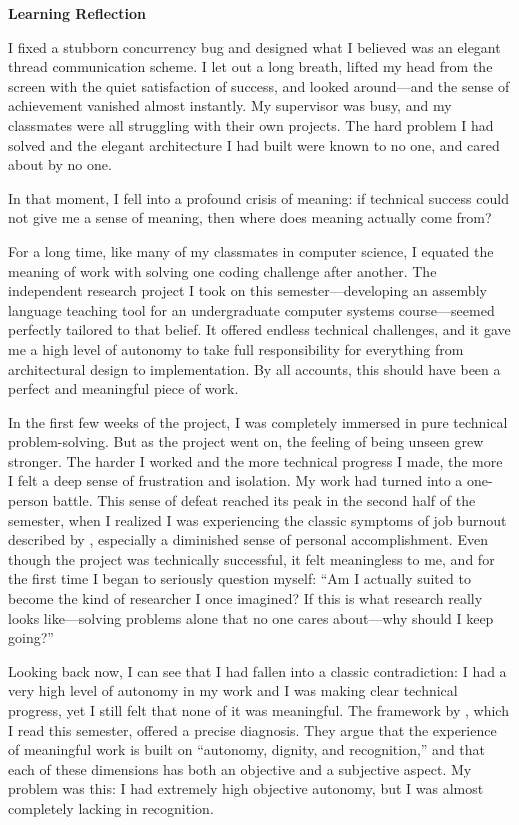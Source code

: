 \documentclass[12pt,a4paper]{article}
\begin{document}
\begin{center}
\textbf{\LARGE Learning Reflection}
\end{center}

\vspace{0.5cm}

I fixed a stubborn concurrency bug and designed what I believed was an elegant thread communication scheme. I let out a long breath, lifted my head from the screen with the quiet satisfaction of success, and looked around---and the sense of achievement vanished almost instantly. My supervisor was busy, and my classmates were all struggling with their own projects. The hard problem I had solved and the elegant architecture I had built were known to no one, and cared about by no one.

In that moment, I fell into a profound crisis of meaning: if technical success could not give me a sense of meaning, then where does meaning actually come from?

For a long time, like many of my classmates in computer science, I equated the meaning of work with solving one coding challenge after another. The independent research project I took on this semester---developing an assembly language teaching tool for an undergraduate computer systems course---seemed perfectly tailored to that belief. It offered endless technical challenges, and it gave me a high level of autonomy to take full responsibility for everything from architectural design to implementation. By all accounts, this should have been a perfect and meaningful piece of work.

In the first few weeks of the project, I was completely immersed in pure technical problem-solving. But as the project went on, the feeling of being unseen grew stronger. The harder I worked and the more technical progress I made, the more I felt a deep sense of frustration and isolation. My work had turned into a one-person battle. This sense of defeat reached its peak in the second half of the semester, when I realized I was experiencing the classic symptoms of job burnout described by \citet{Maslach2001Burnout}, especially a diminished sense of personal accomplishment. Even though the project was technically successful, it felt meaningless to me, and for the first time I began to seriously question myself: ``Am I actually suited to become the kind of researcher I once imagined? If this is what research really looks like---solving problems alone that no one cares about---why should I keep going?''

Looking back now, I can see that I had fallen into a classic contradiction: I had a very high level of autonomy in my work and I was making clear technical progress, yet I still felt that none of it was meaningful. The framework by \citet{Laaser2022MeaningfulWork}, which I read this semester, offered a precise diagnosis. They argue that the experience of meaningful work is built on ``autonomy, dignity, and recognition,'' and that each of these dimensions has both an objective and a subjective aspect. My problem was this: I had extremely high objective autonomy, but I was almost completely lacking in recognition.
\end{document}
